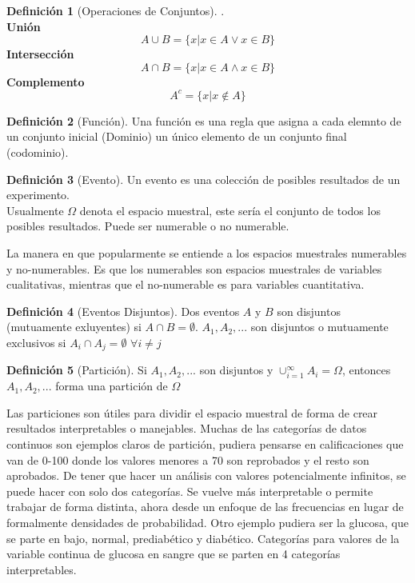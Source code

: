 \documentclass[11pt,a4paper,oneside]{report}
\theoremstyle{definition}
\newtheorem{definicion}{Definición}[chapter]
\theoremstyle{plain}
\theoremstyle{remark}
\begin{document}
\begin{definicion}[Operaciones de Conjuntos].\\
  \textbf{Unión}
  \[ A \cup B = \{ x | x \in A \vee x \in B\} \]
  \textbf{Intersección}
  \[ A \cap B = \{ x | x \in A \wedge x \in B\} \]
  \textbf{Complemento}
  \[ A^{c} = \{ x | x \not \in A\} \]
\end{definicion}

\begin{definicion}[Función]
  Una función es una regla que asigna a cada elemnto de un conjunto inicial (Dominio)
  un único elemento de un conjunto final (codominio).
\end{definicion}

\begin{definicion}[Evento]
  Un evento es una colección de posibles resultados de un experimento.\\
  Usualmente $\Omega$ denota el espacio muestral, este sería el conjunto de todos los posibles resultados. 
  Puede ser numerable o no numerable. 
\end{definicion}
La manera en que popularmente se entiende a los espacios muestrales numerables y no-numerables. Es que los numerables
son espacios muestrales de variables cualitativas, mientras que el no-numerable es para variables cuantitativa. 

\begin{definicion}[Eventos Disjuntos]
  Dos eventos $A$ y $B$ son disjuntos (mutuamente exluyentes) si 
  $A \cap B = \emptyset $. $A_{1},A_{2},...$ son disjuntos o 
  mutuamente exclusivos si $A_{i} \cap A_{j} = \emptyset$ $\forall i \not = j$
\end{definicion}

\begin{definicion}[Partición]
  Si $A_{1},A_{2},...$ son disjuntos y $\cup_{i=1}^{\infty}A_{i}=\Omega$, entonces
  $A_{1},A_{2},...$ forma una partición de $\Omega$
\end{definicion}

Las particiones son útiles para dividir el espacio muestral de forma de crear resultados interpretables o manejables.
Muchas de las categorías de datos continuos son ejemplos claros de partición, pudiera pensarse en calificaciones que
van de 0-100 donde los valores menores a 70 son reprobados y el resto son aprobados. De tener que hacer un análisis 
con valores potencialmente infinitos, se puede hacer con solo dos categorías. Se vuelve más interpretable o permite
trabajar de forma distinta, ahora desde un enfoque de las frecuencias en lugar de formalmente densidades de probabilidad.
Otro ejemplo pudiera ser la glucosa, que se parte en bajo, normal, prediabético y diabético. Categorías para valores
de la variable continua de glucosa en sangre que se parten en 4 categorías interpretables.
\end{document}
